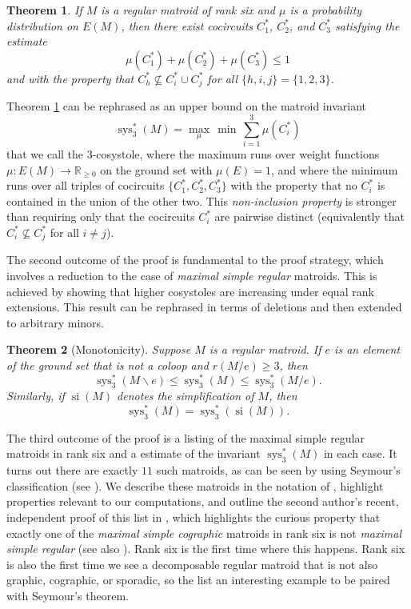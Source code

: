 \documentclass[reqno,12pt]{amsart}
\newtheorem{main}{Theorem}\renewcommand{\themain}{\Alph{main}}
\numberwithin{theorem}{section}
\theoremstyle{plain}
\theoremstyle{definition}
\theoremstyle{remark}
\numberwithin{equation}{section}
\numberwithin{table}{section}
\DeclareMathOperator{\sys}{sys}
\begin{document}
\begin{main}\label{thm:3-cogirth}
If $M$ is a regular matroid of rank six and $\mu$ is a probability distribution on $E(M)$, 
then there exist cocircuits $C_1^*$, $C_2^*$, and $C_3^*$ satisfying the estimate
	\[\mu(C_1^*) + \mu(C_2^*) + \mu(C_3^*) \leq 1\]
and with the property that $C_h^* \not\subseteq C_i^* \cup C_j^*$ for all $\{h, i, j\} = \{1, 2, 3\}$.
\end{main}

Theorem \ref{thm:3-cogirth} can be rephrased as an upper bound on the matroid invariant
    \[\sys_3^*(M) = \max_\mu \, \min \, \sum_{i=1}^{3} \mu(C_i^*)\]
that we call the $3$-cosystole, where the maximum runs over weight functions $\mu:E(M) \to \mathbb{R}_{\geq 0}$ on the ground set with $\mu(E) = 1$, and where the minimum runs over all triples of cocircuits $\{C_1^*, C_2^*, C_3^*\}$ with the property that no $C_i^*$ is contained in the union of the other two. This {\it non-inclusion property} is stronger than requiring only that the cocircuits $C_i^*$ are pairwise distinct (equivalently that $C_i^* \not\subseteq C_j^*$ for all $i \neq j$).




The second outcome of the proof is fundamental to the proof strategy, which involves a reduction to the case of {\it maximal simple regular} matroids. This is achieved by showing that higher cosystoles are increasing under equal rank extensions. This result can be rephrased in terms of deletions and then extended to arbitrary minors.


\begin{main}[Monotonicity]\label{thm:monotonicity}
Suppose $M$ is a regular matroid. If $e$ is an element of the ground set that is not a coloop and $r(M/e)\geq 3$, then 
    \[{\sys}_3^*(M\backslash e)
    \leq {\sys}_3^*(M)
    \leq {\sys}_3^*(M/e).\]
Similarly, if $\operatorname{si}(M)$ denotes the simplification of $M$, then
    \[\sys_3^*(M) = \sys_3^*(\operatorname{si}(M)).\]
\end{main}

The third outcome of the proof is a listing of the maximal simple regular matroids in rank six and a estimate of the invariant $\sys_3^*(M)$ in each case. It turns out there are exactly $11$ such matroids, as can be seen by using Seymour's classification (see \cite{Seymour80, DanilovGrishukhin99}). We describe these matroids in the notation of \cite{Oxley-book}, highlight properties relevant to our computations, and outline the second author's recent, independent proof of this list in \cite{Israel-PhD}, which highlights the curious property that exactly one of the {\it maximal simple cographic} matroids in rank six is not {\it maximal simple regular} (see also \cite[Page 424]{DanilovGrishukhin99}). Rank six is the first time where this happens. Rank six is also the first time we see a decomposable regular matroid that is not also graphic, cographic, or sporadic, so the list an interesting example to be paired with Seymour's theorem.
\end{document}
